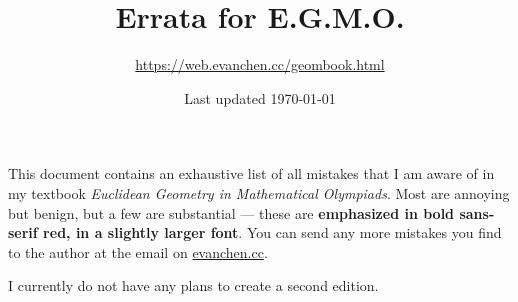 \documentclass[11pt]{scrartcl}
\newcommand{\crucial}[1]{\textbf{\sffamily\large\color{red} #1}}
\begin{document}
\title{Errata for E.G.M.O.}
\subtitle{\url{https://web.evanchen.cc/geombook.html}}
\date{Last updated \today}
\maketitle

This document contains an exhaustive list of all mistakes
that I am aware of in my textbook \emph{Euclidean Geometry in Mathematical Olympiads}.
Most are annoying but benign, but a few are substantial --- these are
\crucial{emphasized in bold sans-serif red, in a slightly larger font}.
You can send any more mistakes you find to the author at
the email on \url{evanchen.cc}.

I currently do not have any plans to create a second edition.

\begin{description}


\end{description}
\end{document}
